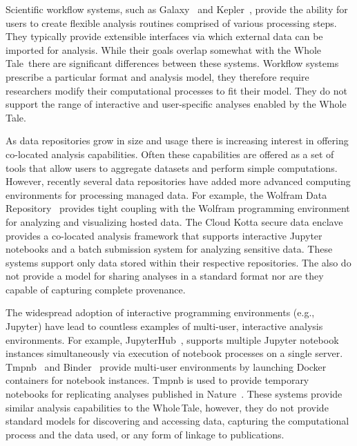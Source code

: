 \documentclass[review]{elsarticle}
\newcommand{\wt}{Whole\,Tale}
\begin{document}
Scientific workflow systems, such as Galaxy~\cite{goecks10galaxy} and 
Kepler~\cite{CPE:CPE994}, provide
the ability for users to create flexible analysis routines 
comprised of various processing steps. They typically provide extensible
interfaces via which external data can be imported for analysis. 
While their goals overlap somewhat
with the \wt\ there are significant differences between these systems.
Workflow systems prescribe a particular format and analysis model,
they therefore require researchers modify their computational processes
to fit their model. They do not support the range of interactive 
and user-specific analyses enabled by the \wt.


As data repositories grow in size and usage there is increasing interest
in offering co-located analysis capabilities. 
Often these capabilities are offered as a set of tools
that allow users to aggregate datasets and perform simple computations. 
However, recently several data repositories have added more advanced
computing environments for processing managed data. 
For example, the Wolfram Data Repository~\cite{wolfram} provides tight coupling
with the Wolfram programming environment for analyzing and visualizing hosted data. 
The Cloud Kotta secure data enclave~\cite{babuji16kotta, babuji16secure} 
provides a co-located analysis framework that supports interactive Jupyter 
notebooks and a batch submission system for analyzing sensitive
data. These systems support only data stored within their
respective repositories. The also do not provide a model for sharing analyses 
in a standard format nor are they capable of capturing complete provenance. 

The widespread adoption of interactive programming environments
(e.g., Jupyter) have lead to countless examples of multi-user, interactive analysis environments.
For example, JupyterHub~\cite{jupyterhub}, supports multiple
Jupyter notebook instances simultaneously via execution of
notebook processes on a single server. 
Tmpnb~\cite{tmpnb} and Binder~\cite{binder} provide multi-user environments by launching
Docker containers for notebook instances. Tmpnb is used to provide
temporary notebooks for replicating analyses published 
in Nature~\cite{shen14notebooks}. 
These systems provide similar analysis capabilities to the \wt, 
however, they do not provide 
standard models for discovering and accessing data, capturing 
the computational process and the data used, or any form of linkage to publications.
\end{document}
